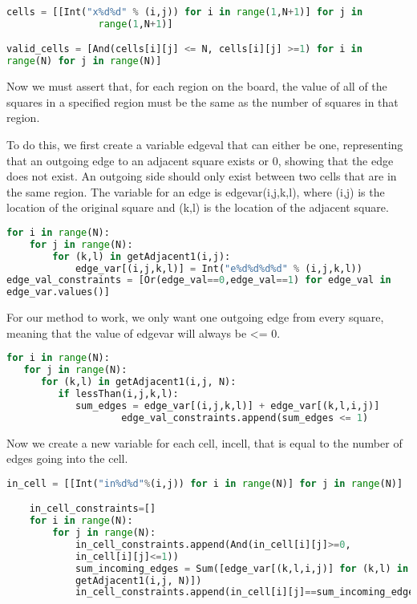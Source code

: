 \begin{lstlisting}[language=python]
cells = [[Int("x%d%d" % (i,j)) for i in range(1,N+1)] for j in
                range(1,N+1)]

valid_cells = [And(cells[i][j] <= N, cells[i][j] >=1) for i in
range(N) for j in range(N)]
\end{lstlisting}

Now we must assert that, for each region on the board, the value of
all of the squares in a specified region must be the same as the
number of squares in that region.
 

To do this, we first create a variable edgeval that can either be one,
representing that an outgoing edge to an adjacent square exists or 0,
showing that the edge does not exist. An outgoing side should only
exist between two cells that are in the same region. The variable for
an edge is edgevar(i,j,k,l), where (i,j) is the location of the
original square and (k,l) is the location of the adjacent square.


\begin{lstlisting}[language=python]
for i in range(N):
    for j in range(N):
        for (k,l) in getAdjacent1(i,j):
            edge_var[(i,j,k,l)] = Int("e%d%d%d%d" % (i,j,k,l))
edge_val_constraints = [Or(edge_val==0,edge_val==1) for edge_val in
edge_var.values()]
\end{lstlisting}

For our method to work, we only want one outgoing edge from every
square, meaning that the value of edgevar will always be <= 0.

\begin{lstlisting}[language=python]
for i in range(N):
   for j in range(N):
      for (k,l) in getAdjacent1(i,j, N):
         if lessThan(i,j,k,l):
            sum_edges = edge_var[(i,j,k,l)] + edge_var[(k,l,i,j)]
                    edge_val_constraints.append(sum_edges <= 1)
\end{lstlisting}

Now we create a new variable for each cell, incell, that is equal to
the number of edges going into the cell.


\begin{lstlisting}[language=python]
in_cell = [[Int("in%d%d"%(i,j)) for i in range(N)] for j in range(N)]

    in_cell_constraints=[]
    for i in range(N):
        for j in range(N):
            in_cell_constraints.append(And(in_cell[i][j]>=0,
            in_cell[i][j]<=1))
            sum_incoming_edges = Sum([edge_var[(k,l,i,j)] for (k,l) in
            getAdjacent1(i,j, N)])
            in_cell_constraints.append(in_cell[i][j]==sum_incoming_edges)
\end{lstlisting}

